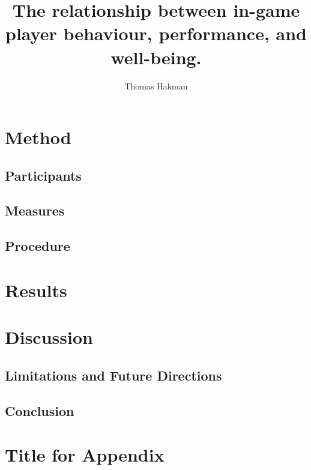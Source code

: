 \documentclass[
  man,
  longtable,
  nolmodern,
  notxfonts,
  notimes,
  colorlinks=true,linkcolor=blue,citecolor=blue,urlcolor=blue]{apa7}
\title{The relationship between in-game player behaviour, performance,
and well-being.}
\author{Thomas Hakman}
\affiliation{
{Department of Scholarly Studies, Generic University}}
\begin{document}
\maketitle


\setcounter{secnumdepth}{-\maxdimen} %

\setlength\LTleft{0pt}


\section{Method}\label{method}

\subsection{Participants}\label{participants}

\subsection{Measures}\label{measures}

\subsection{Procedure}\label{procedure}

\section{Results}\label{results}

\section{Discussion}\label{discussion}

\subsection{Limitations and Future
Directions}\label{limitations-and-future-directions}

\subsection{Conclusion}\label{conclusion}

\appendix

\section{Title for Appendix}\label{title-for-appendix}
\end{document}
